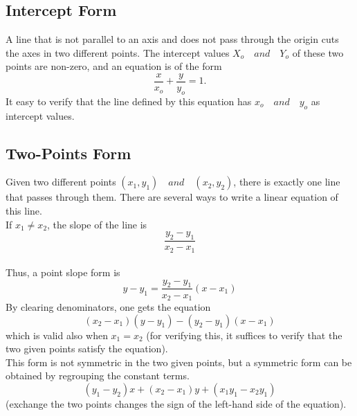 \documentclass[a4paper, 12pt]{report}
\begin{document}
{          \subsection{Intercept Form}
          A line that is not parallel to an axis and does not pass through the origin cuts the axes in two different points. The intercept values $X_o \quad and \quad Y_o$ of these two points are non-zero, and an equation is of the form 
          \begin{equation}
          \frac{x}{x_o} + \frac{y}{y_o} = 1.
          \end{equation}
          It easy to verify that the line defined by this equation has $x_o \quad and \quad y_o$ as intercept values.\\
          
          \subsection{Two-Points Form}
          Given two different points $(x_1,y_1) \quad and \quad (x_2, y_2)$, there is exactly one line that passes through them. There are several ways to write a linear equation of this line.\\
          If $x_1 \neq x_2$, the slope of the line is 
          \begin{equation}
          \frac{y_2 - y_1} {x_2 - x_1}
          \end{equation}\\
          Thus, a point slope form is 
          \begin{equation}
          y - y_1 =\frac{y_2 - y_1} {x_2 - x_1} (x - x_1)
          \end{equation}
          By clearing denominators, one gets the equation
          \begin{equation}
          (x_2 - x_1) (y - y_1) - (y_2 - y_1) (x - x_1)
          \end{equation}
          which is valid also when $x_1 = x_2$ (for verifying this, it suffices to verify that the two given points satisfy the equation).\\
          This form is not symmetric in the two given points, but a symmetric form can be obtained by regrouping the constant terms.
          \begin{equation}
          (y_1 - y_2)x + (x_2 - x_1)y + (x_1 y_1 - x_2 y_1)
          \end{equation}
          (exchange the two points changes the sign of the left-hand side of the equation).\\
          
}
\end{document}

